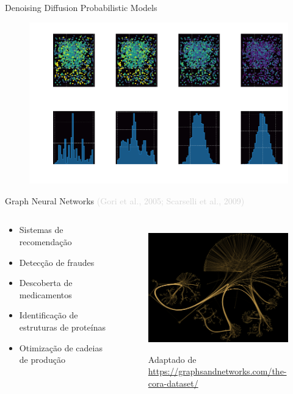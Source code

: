 \begin{frame}[c]{Denoising Diffusion Probabilistic Models}
    \begin{figure}
        \centering
        \includegraphics[height=7cm]{script/images/ddpm_diffusion_z.pdf}
    \end{figure}
\end{frame}

\begin{frame}[c]{Graph Neural Networks {\small \textcolor{LightGray}{(Gori et al., 2005; Scarselli et al., 2009)}}}
    \begin{columns}[c]
        \begin{column}{0.46\linewidth}
            \begin{splusbox}{}
                \begin{itemize}
                    \justifying
                    \item Sistemas de recomendação
                    \item Detecção de fraudes
                    \item Descoberta de medicamentos
                    \item Identificação de estruturas de proteínas
                    \item Otimização de cadeias de produção
                \end{itemize}
            \end{splusbox}
        \end{column}
        \begin{column}{0.46\linewidth}
            \begin{figure}
                \centering
                \includegraphics[height=5.5cm]{images/planetoidcora.png}
                \caption{Adaptado de \url{https://graphsandnetworks.com/the-cora-dataset/}}
            \end{figure}
        \end{column}
    \end{columns}
\end{frame}

